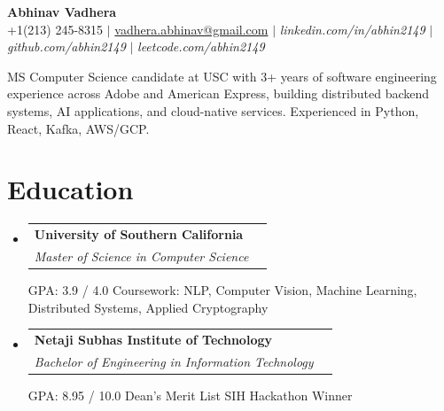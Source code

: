 \documentclass[letterpaper,11pt]{article}
\makeatletter
\newcommand{\resumeSubheading}[4]{
  \item
    \begin{tabular*}{0.97\textwidth}[t]{l@{\extracolsep{\fill}}r}
      \textbf{#1} & \text{\small #2} \\
      \textit{#3} & \text{\small #4} \\
    \end{tabular*}\vspace{-4pt}
}
\newcommand{\newlineText}[1]{
  \vspace{4pt}\small\par\noindent #1
}
\newcommand{\resumeSubHeadingListStart}{
  \begin{itemize}[leftmargin=0.0in, label={}]
    \setlength{\parskip}{0pt}
}
\newcommand{\resumeSubHeadingListEnd}{
  \end{itemize}
}
\makeatother
\begin{document}
\begin{center}
  {\huge \textbf{Abhinav Vadhera}} \\ \vspace{3pt}
  \small +1(213) 245-8315 $|$ \href{mailto:vadhera.abhinav@gmail.com}{vadhera.abhinav@gmail.com} $|$ 
  {\textit{linkedin.com/in/abhin2149}} $|$
  {\textit{github.com/abhin2149}} $|$
  {\textit{leetcode.com/abhin2149}} \\
  \vspace{1pt}
  \parbox{0.99\textwidth}{
  \small MS Computer Science candidate at USC with 3+ years of software engineering experience across Adobe and American Express, building distributed backend systems, AI applications, and cloud-native services. Experienced in Python, React, Kafka, AWS/GCP.
}
  
\end{center}

\section{Education}
\resumeSubHeadingListStart
  \resumeSubheading
  {University of Southern California}{Los Angeles, CA}
  {Master of Science in Computer Science}{Jan 2025 -- Dec 2026}
\newlineText{GPA: 3.9 / 4.0 \text{\textbar} Coursework: NLP, Computer Vision, Machine Learning, Distributed Systems, Applied Cryptography}
  \resumeSubheading
  {Netaji Subhas Institute of Technology}{New Delhi, India}
  {Bachelor of Engineering in Information Technology}{Aug 2017 -- May 2021}
\newlineText{GPA: 8.95 / 10.0 \text{\textbar} Dean's Merit List \text{\textbar} SIH Hackathon Winner}
\resumeSubHeadingListEnd
\end{document}
